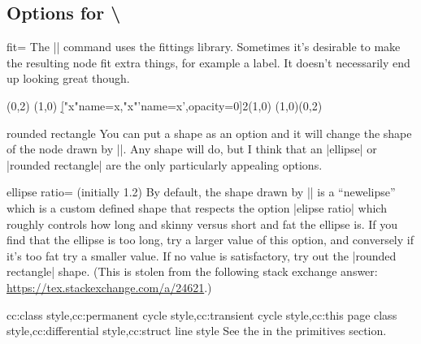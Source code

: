 \documentclass{ltxdoc}
\makeatletter
\def\sectionstring{\textbackslash\@xp\@gobble\string}
\makeatother
\begin{document}
\begin{sseqdata}[name=ex1,degree={#1}{1-#1}]
\subsection{Options for \sectionstring\circleclass}
\begin{key}{fit=}
The |\circleclasses| command uses the \tikzname\space fittings library. Sometimes it's desirable to make the resulting node fit extra things, for example a label. It doesn't necessarily end up looking great though.
\begin{codeexample}[]
\begin{sseqpage}[Adams grading,axes gap=0.7cm]
\class(0,2)
\class(1,0)
\d["x"{name=x},"x"'{name=x',opacity=0}]2(1,0)
\circleclasses[fit=(x)(x'),rounded rectangle](1,0)(0,2)
\end{sseqpage}
\end{codeexample}
\end{key}

\begin{key}{rounded rectangle}
You can put a shape as an option and it will change the shape of the node drawn by |\circleclasses|. Any shape will do, but I think that an |ellipse| or |rounded rectangle| are the only particularly appealing options.
\end{key}

\begin{key}{ellipse ratio= (initially 1.2)}
By default, the shape drawn by |\circleclasses| is a ``newelipse'' which is a custom defined shape that respects the option |elipse ratio| which roughly controls how long and skinny versus short and fat the ellipse is. If you find that the ellipse is too long, try a larger value of this option, and conversely if it's too fat try a smaller value. If no value is satisfactory, try out the |rounded rectangle| shape. (This is stolen from the following stack exchange answer: \url{https://tex.stackexchange.com/a/24621}.)
\end{key}

\begin{keylist}{cc:class style,cc:permanent cycle style,cc:transient cycle style,cc:this page class style,cc:differential style,cc:struct line style}
See the  in the \tikzname\space primitives section.
\end{keylist}


\end{sseqdata}
\end{document}
